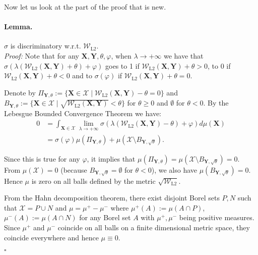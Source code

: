 \documentclass[letterpaper]{article} \usepackage{aaai22}  \usepackage{times}  \usepackage{helvet}  \usepackage{courier}  \usepackage[hyphens]{url}  \usepackage{graphicx} \urlstyle{rm} \def\UrlFont{\rm}  \usepackage{natbib}  \usepackage{caption} \DeclareCaptionStyle{ruled}{labelfont=normalfont,labelsep=colon,strut=off} \frenchspacing  \setlength{\pdfpagewidth}{8.5in}  \setlength{\pdfpageheight}{11in}  \usepackage{algorithm}
\newcommand{\X}{{\mathbf X}}
\newcommand{\Was}{{\mathcal W}}
\begin{document}
\noindent Now let us look at the part of the proof that is new.

\paragraph{Lemma.} $\sigma$ is discriminatory w.r.t. $\mathcal{W}_{\mathrm{L2}}$.\\

\textit{Proof:} Note that for any $\X,\mathbf Y,\theta,\varphi$, when $\lambda\to+\infty$ we have that $\sigma(\lambda(\mathcal{W}_{\mathrm{L2}}(\X,\mathbf Y)+\theta)+\varphi )$ goes to 1 if $\mathcal{W}_{\mathrm{L2}}(\X,\mathbf Y)+\theta>0$, to 0 if $\mathcal{W}_{\mathrm{L2}}(\X,\mathbf Y)+\theta<0$ and to $\sigma(\varphi)$ if $\mathcal{W}_{\mathrm{L2}}(\X,\mathbf Y)+\theta=0$. 

Denote by $\Pi_{\mathbf Y,\theta}:=\{\X\in\mathcal{X}\mid \mathcal{W}_{\mathrm{L2}}(\X,\mathbf Y)-\theta = 0\}$ and $B_{\mathbf Y,\theta}:=\{\X\in\mathcal X \mid \sqrt{\mathcal{W}_{\mathrm{L2}}(\X,\mathbf Y)} < \theta \}$ for $\theta\geq 0$ and $\emptyset$ for $\theta<0$. By the Lebesgue Bounded Convergence Theorem we have: 
\begin{align*}
0 &= \int_{\X\in\mathcal{X}} \lim_{\lambda\to +\infty} \sigma(\lambda(\mathcal{W}_{\mathrm{L2}}(\X,\mathbf Y)-\theta)+\varphi)d\mu(\X)\\
&= \sigma(\varphi)\mu(\Pi_{\mathbf Y,\theta})+\mu(\mathcal{X}\setminus B_{\mathbf Y,\sqrt{\theta}}).
\end{align*}


Since this is true for any $\varphi$, it implies that $\mu(\Pi_{\mathbf Y,\theta})=\mu(\mathcal{X}\setminus B_{\mathbf Y,\sqrt{\theta}})=0$. From $\mu(\mathcal{X})=0$ (because $B_{\mathbf Y,\sqrt{\theta}}=\emptyset$ for $\theta <0$), we also have $\mu(B_{\mathbf Y,\sqrt{\theta}})=0$. Hence $\mu$ is zero on all balls defined by the metric $\sqrt{\Was_{\mathrm{L2}}}$.

From the Hahn decomposition theorem, there exist disjoint Borel sets $P,N$ such that $\mathcal{X}=P\cup N$ and $\mu=\mu^+ - \mu^-$ where $\mu^+(A):=\mu(A\cap P)$, $\mu^-(A):=\mu(A\cap N)$ for any Borel set $A$ with $\mu^+,\mu^-$ being positive measures. Since $\mu^+$ and $\mu^-$ coincide on all balls on a finite dimensional metric space, they coincide everywhere \cite{hoffmann1976measures} and hence $\mu \equiv 0$.



\begin{flushright}
$\square$
\end{flushright}
\end{document}
